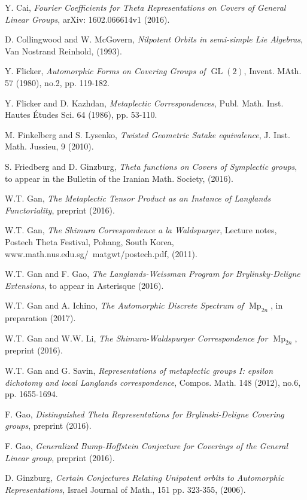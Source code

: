 \documentclass[11pt,reqno]{amsart}
\theoremstyle{definition}
\theoremstyle{remark}
\theoremstyle{definition}
\begin{document}
\begin{thebibliography}{99}
 Y. Cai, \emph{Fourier Coefficients for Theta Representations on Covers of General Linear Groups}, arXiv: 1602.066614v1 (2016).

D. Collingwood and W. McGovern, \emph{Nilpotent Orbits in semi-simple Lie Algebras}, Van Nostrand Reinhold, (1993).

 Y. Flicker, \emph{Automorphic Forms on Covering Groups of $\operatorname{GL}(2)$}, Invent. MAth. 57 (1980), no.2, pp. 119-182.

 Y. Flicker and D. Kazhdan, \emph{Metaplectic Correspondences}, Publ. Math. Inst. Hautes \'{E}tudes Sci. 64 (1986), pp. 53-110.

 M. Finkelberg and S. Lysenko,  \emph{Twisted Geometric Satake equivalence}, J. Inst. Math. Jussieu, 9 (2010).

 S. Friedberg and D. Ginzburg, \emph{Theta functions on Covers of Symplectic groups},  to appear in the Bulletin of the Iranian Math. Society, (2016).

W.T. Gan, \emph{The Metaplectic Tensor Product as an Instance of Langlands Functoriality}, preprint (2016).

W.T. Gan, \emph{The Shimura Correspondence a la Waldspurger}, Lecture notes, Postech Theta Festival, Pohang, South Korea, www.math.nus.edu.sg/~matgwt/postech.pdf, (2011).

W.T. Gan and F. Gao, \emph{The Langlands-Weissman Program for Brylinsky-Deligne Extensions}, to appear in Asterisque (2016).

 W.T. Gan and A. Ichino, \emph{The Automorphic Discrete Spectrum of $\operatorname{Mp}_{2n}$}, in preparation (2017).

 W.T. Gan and W.W. Li, \emph{The Shimura-Waldspurger Correspondence for $\operatorname{Mp}_{2n}$}, preprint (2016).

 W.T. Gan and G. Savin, \emph{Representations of metaplectic groups I: epsilon dichotomy and local Langlands  correspondence}, Compos. Math. 148 (2012), no.6, pp. 1655-1694.

 F. Gao, \emph{Distinguished Theta Representations for Brylinski-Deligne Covering groups},  preprint (2016).

 F. Gao, \emph{Generalized Bump-Hoffstein Conjecture for Coverings of the General Linear group}, preprint (2016).

D. Ginzburg, \emph{Certain Conjectures Relating Unipotent orbits to Automorphic Representations}, Israel Journal of Math., 151  pp. 323-355, (2006). 


\end{thebibliography}
\end{document}
